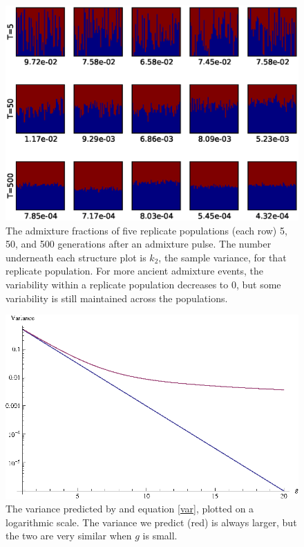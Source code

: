 \documentclass[11pt]{amsart}
\begin{document}
\newpage
\begin{figure}[htp!]
  \begin{center}
    \includegraphics[scale=.6]{ensemble_with_variance.eps}
    \caption{The admixture fractions of five replicate populations (each row) 5, 50, and 500 generations after an admixture pulse. The number underneath each structure plot is $k_2$, the sample variance, for that replicate population. For more ancient admixture events, the variability within a replicate population decreases to 0, but some variability is still maintained across the populations.}
    \label{ensemble}
  \end{center}
\end{figure}

\newpage
\begin{figure}[htp!]
  \begin{center}
    \includegraphics[scale=1.25]{verdu_comparison.eps}
    \caption{The variance predicted by \citet{verdu2011general} and equation \ref{var}, plotted on a logarithmic scale. The variance we predict (red) is always larger, but the two are very similar when $g$ is small.}
    \label{ek2_verdu}
  \end{center}
\end{figure}
\end{document}
